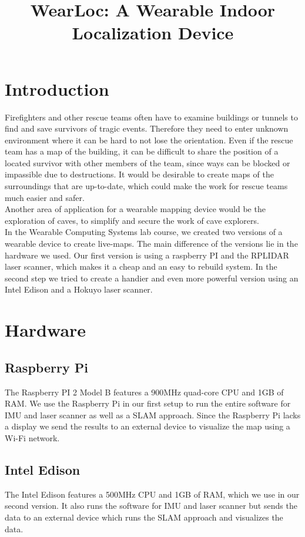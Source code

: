 \documentclass{sigchi-ext}
\title{WearLoc: A Wearable Indoor Localization Device}
\author{%
  \alignauthor{%
    \textbf{Lukas Gemein}\\
    \email{gemeinl@cs.uni-freiburg.de} }\alignauthor{%
    \textbf{Jennifer Nist}\\
    \email{nistj@cs.uni-freiburg.de} } \vfil \alignauthor{%
    \textbf{Rick Gelhausen}\\
    \email{rick.gelhausen@gmail.com} }\alignauthor{%
    \textbf{David Speck}\\
    \email{speckd@cs.uni-freiburg.de} } \vfil \alignauthor{%
    \textbf{Andre Biedenkapp}\\   
    \email{biedenka@cs.uni-freiburg.de}}}
\begin{document}
\maketitle

\RaggedRight{} 

\section{Introduction}
Firefighters and other rescue teams often have to examine buildings or tunnels to find and save survivors of tragic events. Therefore they need to enter unknown environment where it can be hard to not lose the orientation. Even if the rescue team has a map of the building, it can be difficult to share the position of a located survivor with other members of the team, since ways can be blocked or impassible due to destructions. It would be desirable to create maps of the surroundings that are up-to-date, which could make the work for rescue teams much easier and safer.\\
Another area of application for a wearable mapping device would be the exploration of caves, to simplify and secure the work of cave explorers.\\
In the Wearable Computing Systems lab course, we created two versions of a wearable device to create live-maps. The main difference of the versions lie in the hardware we used. Our first version is using a raspberry PI and the RPLIDAR laser scanner, which makes it a cheap and an easy to rebuild system. In the second step we tried to create a handier and even more powerful version using an Intel Edison and a Hokuyo laser scanner.

\newpage
\section{Hardware}
\subsection{Raspberry Pi}
The Raspberry PI 2 Model B features a 900MHz quad-core CPU and 1GB of RAM. We use the Raspberry Pi in our first setup to run the entire software for IMU and laser scanner as well as a SLAM approach. Since the Raspberry Pi lacks a display we send the results to an external device to visualize the map using a Wi-Fi network.

\subsection{Intel Edison}
The Intel Edison features a 500MHz CPU and 1GB of RAM, which we use in our second version. It also runs the software for IMU and laser scanner but sends the data to an external device which runs the SLAM approach and visualizes the data.
\end{document}
